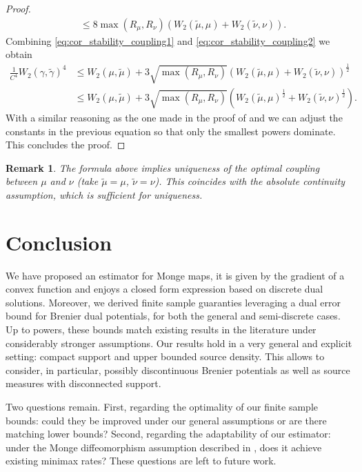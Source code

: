 \documentclass[11pt]{article}
\newtheorem{remark}[lemma]{Remark}
\newcommand{\1}{\mathbbm{1}}
\numberwithin{equation}{section}
\begin{document}
\begin{proof}
\begin{align}
        &\leq 8\max(R_\mu,R_\nu)(W_2(\tilde{\mu},\mu)+W_2(\tilde{\nu},\nu)).
        \label{eq:cor_stability_coupling2}
    \end{align}
    Combining \eqref{eq:cor_stability_coupling1} and \eqref{eq:cor_stability_coupling2} we obtain
    \begin{align*}
        \frac{1}{C^4}W_2(\gamma,\tilde{\gamma})^4
        &\leq W_2(\mu,\tilde{\mu})+3\sqrt{\max(R_\mu,R_\nu)}(W_2(\tilde{\mu},\mu)+W_2(\tilde{\nu},\nu))^{\frac{1}{2}}\\
        &\leq W_2(\mu,\tilde{\mu})+3\sqrt{\max(R_\mu,R_\nu)}\left(W_2(\tilde{\mu},\mu)^{\frac{1}{2}}+W_2(\tilde{\nu},\nu)^{\frac{1}{2}}\right).
    \end{align*}
    With a similar reasoning as the one made in the proof of  and  we can adjust the constants in the previous equation so that only the smallest powers dominate. This concludes the proof.
\end{proof}



\begin{remark}
    The formula above implies uniqueness of the optimal coupling between $\mu$ and $\nu$ (take $\tilde{\mu} = \mu$, $\tilde{\nu} = \nu$). This coincides with the absolute continuity assumption, which is sufficient for uniqueness. 
\end{remark}

\section{Conclusion}
We have proposed an estimator for Monge maps, it is given by the gradient of a convex function and enjoys a closed form expression based on discrete dual solutions. Moreover, we derived finite sample guaranties leveraging a dual error bound for Brenier dual potentials, for both the general and semi-discrete cases. Up to powers, these bounds match existing results in the literature under considerably stronger assumptions. Our results hold in a very general and explicit setting: compact support and upper bounded source density. This allows to consider, in particular, possibly discontinuous Brenier potentials as well as source measures with disconnected support. 

Two questions remain. First, regarding the optimality of our finite sample bounds: could they be improved under our general assumptions or are there matching lower bounds?  Second, regarding the adaptability of our estimator: under the Monge diffeomorphism assumption described in , does it achieve existing minimax rates? These questions are left to future work.
\end{document}
